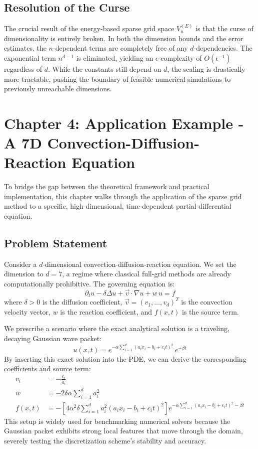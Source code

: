 \documentclass[12pt, a4paper]{article}
\begin{document}
\subsection{Resolution of the Curse}
The crucial result of the energy-based sparse grid space $V_n^{(E)}$ is that the curse of dimensionality is entirely broken. In both the dimension bounds and the error estimates, the $n$-dependent terms are completely free of any $d$-dependencies. The exponential term $n^{d-1}$ is eliminated, yielding an $\epsilon$-complexity of $O(\epsilon^{-1})$ regardless of $d$. While the constants still depend on $d$, the scaling is drastically more tractable, pushing the boundary of feasible numerical simulations to previously unreachable dimensions.

\section{Chapter 4: Application Example - A 7D Convection-Diffusion-Reaction Equation}

To bridge the gap between the theoretical framework and practical implementation, this chapter walks through the application of the sparse grid method to a specific, high-dimensional, time-dependent partial differential equation. 

\subsection{Problem Statement}
Consider a $d$-dimensional convection-diffusion-reaction equation. We set the dimension to $d=7$, a regime where classical full-grid methods are already computationally prohibitive. The governing equation is:
\begin{equation}
\partial_t u - \delta \Delta u + \vec{v} \cdot \nabla u + w\, u = f
\end{equation}
where $\delta > 0$ is the diffusion coefficient, $\vec{v} = (v_1, \dots, v_d)^T$ is the convection velocity vector, $w$ is the reaction coefficient, and $f(x,t)$ is the source term.

We prescribe a scenario where the exact analytical solution is a traveling, decaying Gaussian wave packet:
\begin{equation}
u(x,t) = e^{-\alpha\sum_{i=1}^d(a_i x_i - b_i + c_i t)^2}\,e^{-\beta t}
\end{equation}
By inserting this exact solution into the PDE, we can derive the corresponding coefficients and source term:
\begin{align}
v_i &= -\frac{c_i}{a_i} \\
w &= -2\delta\alpha\sum_{i=1}^d a_i^2 \\
f(x,t) &= - \left[ 4\alpha^2\delta \sum_{i=1}^d a_i^2(a_ix_i-b_i+c_it)^2 \right] e^{-\alpha\sum_{i=1}^d(a_i x_i - b_i + c_i t)^2 -\beta t}
\end{align}
This setup is widely used for benchmarking numerical solvers because the Gaussian packet exhibits strong local features that move through the domain, severely testing the discretization scheme's stability and accuracy.
\end{document}
